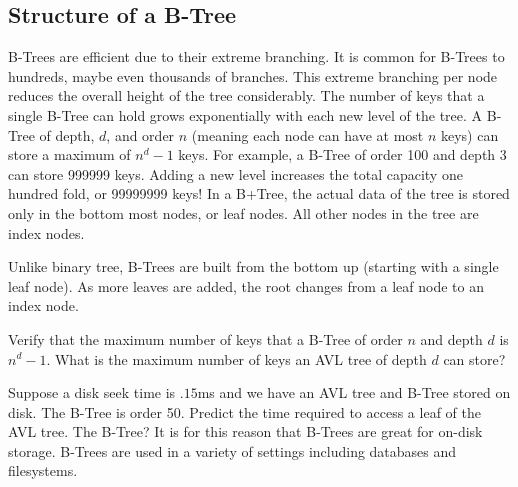 \subsection*{Structure of a B-Tree}
B-Trees are efficient due to their extreme branching.  It is common for B-Trees to hundreds, maybe even thousands of branches.
This extreme branching per node reduces the overall height of the tree considerably.
The number of keys that a single B-Tree can hold grows exponentially with each new level of the tree.  A B-Tree of depth, $d$, and order $n$ (meaning each node can have at most $n$ keys) can store a maximum of $n^{d} - 1$ keys.  For example, a B-Tree of order 100 and depth 3 can store 999999 keys.  Adding a new level increases the total capacity one hundred fold, or 99999999 keys!
In a B+Tree, the actual data of the tree is stored only in the bottom most nodes, or leaf nodes.  All other nodes in the tree are index nodes.

Unlike binary tree, B-Trees are built from the bottom up (starting with a single leaf node).  As more leaves are added, the root changes from a leaf node to an index node.  

\begin{problem}
Verify that the maximum number of keys that a B-Tree of order $n$ and depth $d$ is $n^{d}-1$.
What is the maximum number of keys an AVL tree of depth $d$ can store?

Suppose a disk seek time is $.15$ms and we have an AVL tree and B-Tree stored on disk.  The B-Tree is order 50.
Predict the time required to access a leaf of the AVL tree.  The B-Tree?
It is for this reason that B-Trees are great for on-disk storage.  B-Trees are used in a variety of settings including databases and filesystems.
\end{problem}

